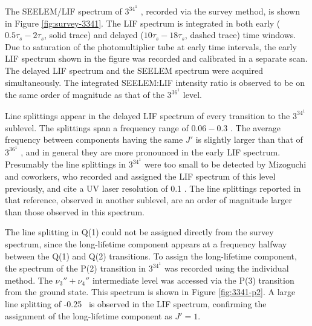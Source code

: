 \documentclass[12pt]{mitthesis}
\begin{document}

The SEELEM/LIF spectrum of $3^34^1$ , recorded via the survey
method, is shown in Figure \ref{fig:survey-3341}.  The LIF spectrum is
integrated in both early ($0.5\tau_s-2\tau_s$, solid trace) and
delayed ($10\tau_s-18\tau_s$, dashed trace) time windows.  Due to
saturation of the photomultiplier tube at early time intervals, the
early LIF spectrum shown in the figure was recorded and calibrated in
a separate scan.  The delayed LIF spectrum and the SEELEM spectrum
were acquired simultaneously.  The integrated SEELEM:LIF intensity
ratio is observed to be on the same order of magnitude as that of the
$3^36^1$  level.

Line splittings appear in the delayed LIF spectrum of every transition
to the $3^34^1$  sublevel.  The splittings span a frequency
range of $0.06-0.3$ \rcm.  The average frequency between components
having the same $J'$ is slightly larger than that of $3^36^1$ ,
and in general they are more pronounced in the early LIF spectrum.
Presumably the line splittings in $3^34^1$  were too small to be
detected by Mizoguchi and coworkers, who recorded and assigned the LIF
spectrum of this level previously, and cite a UV laser resolution of
0.1 \rcm \cite{mizoguchi00}.  The line splittings reported in that
reference, observed in another sublevel, are an order of magnitude
larger than those observed in this spectrum.

The line splitting in Q(1) could not be assigned directly from the
survey spectrum, since the long-lifetime component appears at a
frequency halfway between the Q(1) and Q(2) transitions.  To assign
the long-lifetime component, the spectrum of the P(2) transition in
$3^34^1$  was recorded using the individual method.  The
$\nu_3''+\nu_4''$ intermediate level was accessed via the P(3)
transition from the ground state.  This spectrum is shown in Figure
\ref{fig:3341-p2}.  A large line splitting of -0.25 \rcm\ is observed
in the LIF spectrum, confirming the assignment of the long-lifetime
component as $J'=1$.

\end{document}
